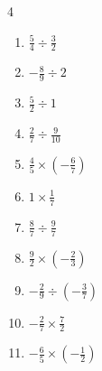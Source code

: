 \begin{multicols}{4}
\begin{enumerate}

  \item $\displaystyle \frac{5}{4}\div{}\frac{3}{2}$


  \item $\displaystyle -\frac{8}{9}\div{}2$


  \item $\displaystyle \frac{5}{2}\div{}1$


\columnbreak %

  \item $\displaystyle \frac{2}{7}\div{}\frac{9}{10}$


  \item $\displaystyle \frac{4}{5}\times{}\left(-\frac{6}{7}\right)$


  \item $\displaystyle 1\times{}\frac{1}{7}$


  \item $\displaystyle \frac{8}{7}\div{}\frac{9}{7}$


  \item $\displaystyle \frac{9}{2}\times{}\left(-\frac{2}{3}\right)$

        \phantom{$\displaystyle =-3$}

  \item $\displaystyle -\frac{2}{9}\div{}\left(-\frac{3}{7}\right)$


  \item $\displaystyle -\frac{2}{7}\times{}\frac{7}{2}$

        \phantom{$\displaystyle =-1$}

  \item $\displaystyle -\frac{6}{5}\times{}\left(-\frac{1}{2}\right)$



\end{enumerate}
\end{multicols}
